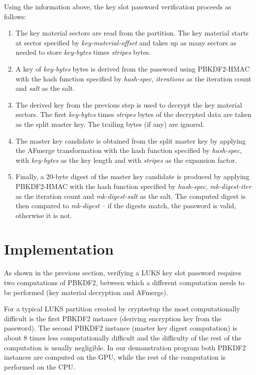 \documentclass[12pt,oneside]{fithesis2}
\begin{document}
      Using the information above, the key slot password verification proceeds as follows:
      \begin{enumerate}
        \item The key material sectors are read from the partition. The key material starts at sector specified by \emph{key-material-offset} and takes up as many sectors as needed to store \emph{key-bytes} times \emph{stripes} bytes.
        \item A key of \emph{key-bytes} bytes is derived from the password using PBKDF2-HMAC with the hash function specified by \emph{hash-spec}, \emph{iterations} as the iteration count and \emph{salt} as the salt.
        \item The derived key from the previous step is used to decrypt the key material sectors. The first \emph{key-bytes} times \emph{stripes} bytes of the decrypted data are taken as the split master key. The trailing bytes (if any) are ignored.
        \item The master key candidate is obtained from the split master key by applying the AFmerge transformation with the hash function specified by \emph{hash-spec}, with \emph{key-bytes} as the key length and with \emph{stripes} as the expansion factor.
        \item Finally, a 20-byte digest of the master key candidate is produced by applying PBKDF2-HMAC with the hash function specified by \emph{hash-spec}, \emph{mk-digest-iter} as the iteration count and \emph{mk-digest-salt} as the salt. The computed digest is then compared to \emph{mk-digest} -- if the digests match, the password is valid, otherwise it is not.
      \end{enumerate}
      
      
      \section{Implementation}
      As shown in the previous section, verifying a LUKS key slot password requires two computations of PBKDF2, between which a different computation needs to be performed (key material decryption and AFmerge).
      
      For a typical LUKS partition created by cryptsetup the most computationally difficult is the first PBKDF2 instance (deriving encryption key from the password). The second PBKDF2 instance (master key digest computation) is about 8 times less computationally difficult and the difficulty of the rest of the computation is usually negligible. In our demonstration program both PBKDF2 instances are computed on the GPU, while the rest of the computation is performed on the CPU.
      
\end{document}
